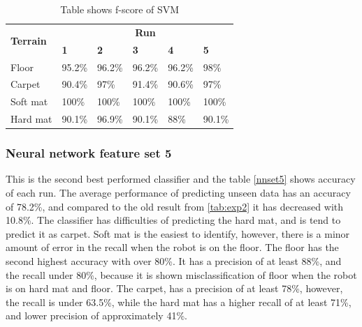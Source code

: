 \documentclass[USenglish]{ifimaster}  %
\begin{document}
	\begin{table}[h]
		\centering
		\begin{tabular}{@{}llllll@{}}
			\toprule
			\multirow{2}{*}{\textbf{Terrain}} & \multicolumn{5}{c}{\textbf{Run}} \\ \cmidrule(l){2-6} 
			& \multicolumn{1}{l|}{\textbf{1}} & \multicolumn{1}{l|}{\textbf{2}} & \multicolumn{1}{l|}{\textbf{3}} & \multicolumn{1}{l|}{\textbf{4}} & \textbf{5} \\ \midrule
			\multicolumn{1}{l|}{Floor} & \multicolumn{1}{l|}{95.2\%} & \multicolumn{1}{l|}{96.2\%} & \multicolumn{1}{l|}{96.2\%} & \multicolumn{1}{l|}{96.2\%} & 98\% \\ \midrule
			\multicolumn{1}{l|}{Carpet} & \multicolumn{1}{l|}{90.4\%} & \multicolumn{1}{l|}{97\%} & \multicolumn{1}{l|}{91.4\%} & \multicolumn{1}{l|}{90.6\%} & 97\% \\ \midrule
			\multicolumn{1}{l|}{Soft mat} & \multicolumn{1}{l|}{100\%} & \multicolumn{1}{l|}{100\%} & \multicolumn{1}{l|}{100\%} & \multicolumn{1}{l|}{100\%} & 100\% \\ \midrule
			\multicolumn{1}{l|}{Hard mat} & \multicolumn{1}{l|}{90.1\%} & \multicolumn{1}{l|}{96.9\%} & \multicolumn{1}{l|}{90.1\%} & \multicolumn{1}{l|}{88\%} & 90.1\% \\ \bottomrule
		\end{tabular}
		\caption{Table shows f-score of SVM}
		\label{fscoresvm}
	\end{table}
	\FloatBarrier
\newpage
\subsubsection{Neural network feature set 5}
This is the second best performed classifier and the table \ref{nnset5} shows accuracy of each run. The average performance of predicting unseen data has an accuracy of 78.2\%, and compared to the old result from \ref{tab:exp2} it has decreased with 10.8\%. The classifier has difficulties of predicting the hard mat, and is tend to predict it as carpet. Soft mat is the easiest to identify, however, there is a minor amount of error in the recall when the robot is on the floor. The floor has the second highest accuracy with over 80\%. It has a precision of at least 88\%, and the recall under 80\%, because it is shown misclassification of floor when the robot is on hard mat and floor. The carpet, has a precision of at least 78\%, however, the recall is under 63.5\%, while the hard mat has a higher recall of at least 71\%, and lower precision of approximately 41\%. 
\end{document}
